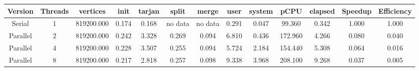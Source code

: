 \begin{tabular}{|c|c|c|c|c|c|c|c|c|c|c|c|c|}
\toprule
 Version &  Threads &   vertices &  init &  tarjan &   split &   merge &  user &  system &    pCPU &  elapsed &  Speedup &  Efficiency \\
\midrule
  Serial &        1 & 819200.000 & 0.174 &   0.168 & no data & no data & 0.291 &   0.047 &  99.360 &    0.342 &    1.000 &       1.000 \\
Parallel &        2 & 819200.000 & 0.242 &   3.328 &   0.269 &   0.094 & 6.810 &   0.436 & 172.960 &    4.266 &    0.080 &       0.040 \\
Parallel &        4 & 819200.000 & 0.228 &   3.507 &   0.255 &   0.094 & 5.724 &   2.184 & 154.440 &    5.308 &    0.064 &       0.016 \\
Parallel &        8 & 819200.000 & 0.217 &   2.818 &   0.257 &   0.098 & 9.338 &   3.968 & 208.100 &    9.268 &    0.037 &       0.005 \\
\bottomrule
\end{tabular}
